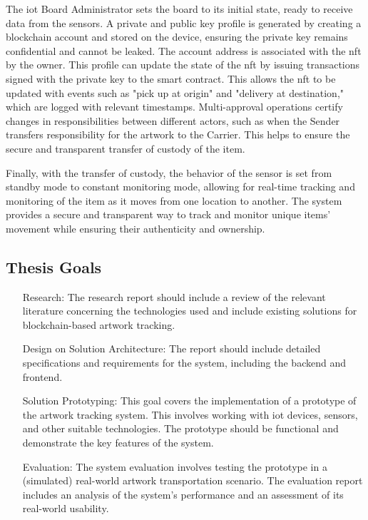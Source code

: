 The \gls{iot} Board Administrator sets the board to its initial state, ready to receive data from the sensors. A private and public key profile is generated by creating a blockchain account and stored on the device, ensuring the private key remains confidential and cannot be leaked. The account address is associated with the \gls{nft} by the owner. This profile can update the state of the \gls{nft} by issuing transactions signed with the private key to the smart contract. This allows the \gls{nft} to be updated with events such as "pick up at origin" and "delivery at destination," which are logged with relevant timestamps. Multi-approval operations certify changes in responsibilities between different actors, such as when the Sender transfers responsibility for the artwork to the Carrier. This helps to ensure the secure and transparent transfer of custody of the item. 

Finally, with the transfer of custody, the behavior of the sensor is set from standby mode to constant monitoring mode, allowing for real-time tracking and monitoring of the item as it moves from one location to another. The system provides a secure and transparent way to track and monitor unique items' movement while ensuring their authenticity and ownership.

\subsection{Thesis Goals}
\label{sec:thesis_goals}
\begin{itemize}[font=\textbf, align=left]
    \item[Research:] The research report should include a review of the relevant literature concerning the technologies used and include existing solutions for blockchain-based artwork tracking.
    \item[Design on Solution Architecture:] The report should include detailed specifications and requirements for the system, including the backend and frontend.
    \item[Solution Prototyping:] This goal covers the implementation of a prototype of the artwork tracking system. This involves working with \gls{iot} devices, sensors, and other suitable technologies. The prototype should be functional and demonstrate the key features of the system.
    \item[Evaluation:] The system evaluation involves testing the prototype in a (simulated) real-world artwork transportation scenario. The evaluation report includes an analysis of the system's performance and an assessment of its real-world usability.
\end{itemize}

